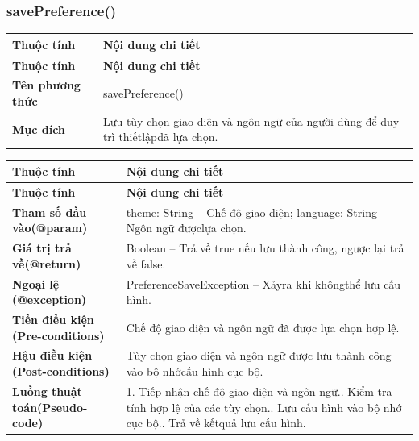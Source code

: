 \subsubsection{savePreference()}
\begin{longtable}{|L{0.24\textwidth}|L{0.70\textwidth}|}
\hline
\textbf{Thuộc tính} & \textbf{Nội dung chi tiết} \\
\hline
\endfirsthead
\hline
\textbf{Thuộc tính} & \textbf{Nội dung chi tiết} \\
\hline
\endhead
\textbf{Tên phương thức} & savePreference() \\
\hline
\textbf{Mục đích} & Lưu tùy chọn giao diện và ngôn ngữ của người dùng để duy trì thiết\newline lậpđã lựa chọn. \\
\hline
\end{longtable}
\vspace{-0.5\baselineskip}
\begin{longtable}{|L{0.24\textwidth}|L{0.70\textwidth}|}
\hline
\textbf{Thuộc tính} & \textbf{Nội dung chi tiết} \\
\hline
\endfirsthead
\hline
\textbf{Thuộc tính} & \textbf{Nội dung chi tiết} \\
\hline
\endhead
\textbf{Tham số đầu vào}\newline \textbf{(@param)} & theme: String – Chế độ giao diện; language: String – Ngôn ngữ được\newline lựa chọn. \\
\hline
\textbf{Giá trị trả về(@return)} & Boolean – Trả về true nếu lưu thành công, ngược lại trả về false. \\
\hline
\textbf{Ngoại lệ (@exception)} & PreferenceSaveException – Xảyra khi khôngthể lưu cấu hình. \\
\hline
\textbf{Tiền điều kiện (Pre-}\newline \textbf{conditions)} & Chế độ giao diện và ngôn ngữ đã được lựa chọn hợp lệ. \\
\hline
\textbf{Hậu điều kiện (Post-}\newline \textbf{conditions)} & Tùy chọn giao diện và ngôn ngữ được lưu thành công vào bộ nhớ\newline cấu hình cục bộ. \\
\hline
\textbf{Luồng thuật toán}\newline \textbf{(Pseudo-code)} & 1. Tiếp nhận chế độ giao diện và ngôn ngữ.. Kiểm tra tính hợp lệ của các tùy chọn.. Lưu cấu hình vào bộ nhớ cục bộ.. Trả về kếtquả lưu cấu hình. \\
\hline
\end{longtable}
\vspace{-0.5\baselineskip}
